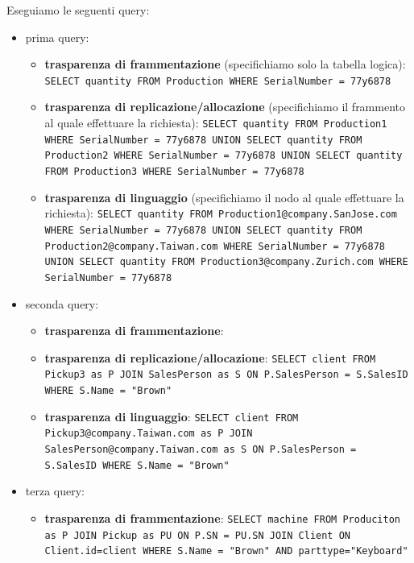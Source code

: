 \begin{esempio} 
      Eseguiamo le seguenti query:
      \begin{itemize}
            \item prima query:
                  \begin{itemize}
                        \item \textbf{trasparenza di frammentazione} (specifichiamo solo la tabella logica): \texttt{SELECT quantity FROM Production WHERE SerialNumber = 77y6878}
                        \item \textbf{trasparenza di replicazione/allocazione} (specifichiamo il frammento al quale effettuare la richiesta): \texttt{SELECT quantity FROM Production1 WHERE SerialNumber = 77y6878 UNION SELECT quantity FROM Production2 WHERE SerialNumber = 77y6878 UNION SELECT quantity FROM Production3 WHERE SerialNumber = 77y6878  }
                        \item \textbf{trasparenza di linguaggio} (specifichiamo il nodo al quale effettuare la richiesta): \texttt{SELECT quantity FROM Production1@company.SanJose.com WHERE SerialNumber = 77y6878 UNION SELECT quantity FROM Production2@company.Taiwan.com WHERE SerialNumber = 77y6878 UNION SELECT quantity FROM Production3@company.Zurich.com WHERE SerialNumber = 77y6878  }
                  \end{itemize}
            \item seconda query:
                  \begin{itemize}
                        \item \textbf{trasparenza di frammentazione}:
                        \item \textbf{trasparenza di replicazione/allocazione}: \texttt{SELECT client FROM Pickup3 as P JOIN SalesPerson as S ON P.SalesPerson = S.SalesID WHERE S.Name = "Brown"}
                        \item \textbf{trasparenza di linguaggio}: \texttt{SELECT client FROM Pickup3@company.Taiwan.com as P JOIN SalesPerson@company.Taiwan.com as S ON P.SalesPerson = S.SalesID WHERE S.Name = "Brown"}
                  \end{itemize}
            \item terza query:
                  \begin{itemize}
                        \item \textbf{trasparenza di frammentazione}:  \texttt{SELECT machine FROM Produciton as P JOIN Pickup as PU ON P.SN = PU.SN JOIN Client ON Client.id=client WHERE S.Name = "Brown" AND parttype="Keyboard"}

\end{itemize}
\end{itemize}
\end{esempio}
